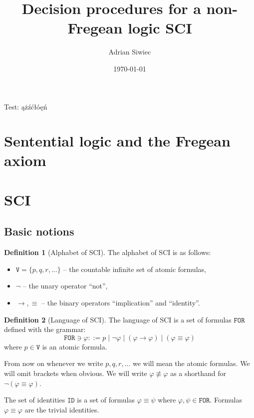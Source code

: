 \documentclass{article}
\title{Decision procedures for a non-Fregean logic SCI}
\author{Adrian Siwiec}
\theoremstyle{definition}
\newtheorem{definition}{Definition}[section]
\newcommand*{\id}{\equiv}
\newcommand*{\ra}{\rightarrow}
\newcommand*{\V}{\texttt{V}}
\newcommand*{\FOR}{\texttt{FOR}}
\newcommand*{\ID}{\texttt{ID}}
\begin{document}
\date{\today}

\maketitle

Test: ążźćłóęń

\section{Sentential logic and the Fregean axiom}
\section{SCI}
\subsection{Basic notions}

\begin{definition}[Alphabet of SCI]
    The alphabet of SCI is as follows:
    \begin{itemize}
        \item $\V = \{p, q, r, ...\}$ -- the countable infinite set of atomic formulas,
        \item $\lnot$  -- the unary operator \enquote{not},
        \item $\ra, \id$ -- the binary operators \enquote{implication} and \enquote{identity}.
    \end{itemize}
\end{definition}

\begin{definition}[Language of SCI]
    The language of SCI is a set of formulas $\FOR$ defined with the grammar:
    $$
        \FOR \ni \varphi ::= p  \; | \;  \lnot \varphi \; | \; (\varphi \ra \varphi) \; | \; (\varphi \id \varphi)
    $$ where $p \in \V$ is an atomic formula.
\end{definition}

From now on whenever we write $p, q, r, ... $ we will mean the atomic formulas. We will omit brackets when obvious. We will write $\varphi \not \id \varphi$ as a shorthand for $\lnot(\varphi \id \varphi)$.

The set of identities $\ID$ is a set of formulas $\varphi \id \psi$ where $\varphi, \psi \in \FOR$. Formulas $\varphi \id \varphi$ are the trivial identities.
\end{document}
